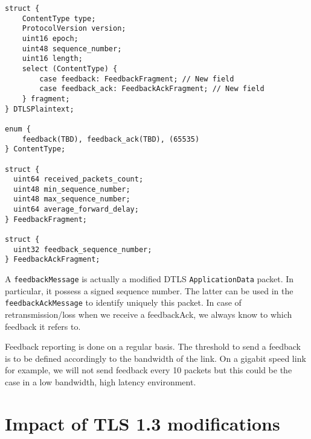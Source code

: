 
\begin{lstlisting}[caption= Feedback and Feedback Ack messages structure, label=lst:feedbackM]
struct {
    ContentType type;
    ProtocolVersion version;
    uint16 epoch;
    uint48 sequence_number;
    uint16 length;
    select (ContentType) {
        case feedback: FeedbackFragment; // New field
        case feedback_ack: FeedbackAckFragment; // New field
    } fragment;
} DTLSPlaintext;

enum {
    feedback(TBD), feedback_ack(TBD), (65535)
} ContentType;

struct {
  uint64 received_packets_count;
  uint48 min_sequence_number;
  uint48 max_sequence_number;
  uint64 average_forward_delay;
} FeedbackFragment;

struct {
  uint32 feedback_sequence_number;
} FeedbackAckFragment;
\end{lstlisting}

A \texttt{feedbackMessage} is actually a modified DTLS \texttt{ApplicationData} packet. In particular, it possess a signed sequence number. The latter can be used in the \texttt{feedbackAckMessage} to identify uniquely this packet. In case of retransmission/loss when we receive a feedbackAck, we always know to which feedback it refers to.

Feedback reporting is done on a regular basis. The threshold to send a feedback is to be defined accordingly to the bandwidth of the link. On a gigabit speed link for example, we will not send feedback every 10 packets but this could be the case in a low bandwidth, high latency environment.

\section{Impact of TLS 1.3 modifications}\label{sec:tls13impact}

